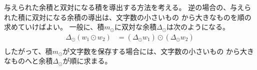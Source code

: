 	\begin{todo}[余積から積の導出]\label{todo:余積から積の導出} %
		与えられた余積と双対になる積を導出する方法を考える。
		逆の場合の、与えられた積に双対になる余積の導出は、文字数の小さいもの
		から大きなものを順の求めていけばよい。
		一般に、積$m_\odot$に双対な余積$\Delta_\odot$は次のようになる。
		\begin{equation}\begin{split} %
			\Delta_\odot(w_1\odot w_2) &= (\Delta_\odot w_1)\odot(\Delta_\odot w_2) \\
		\end{split}\end{equation} %
		したがって、積$m_\odot$が文字数を保存する場合には、文字数の小さいもの
		から大きなものへと余積$\Delta_\odot$が順に求まる。
	\end{todo} %
